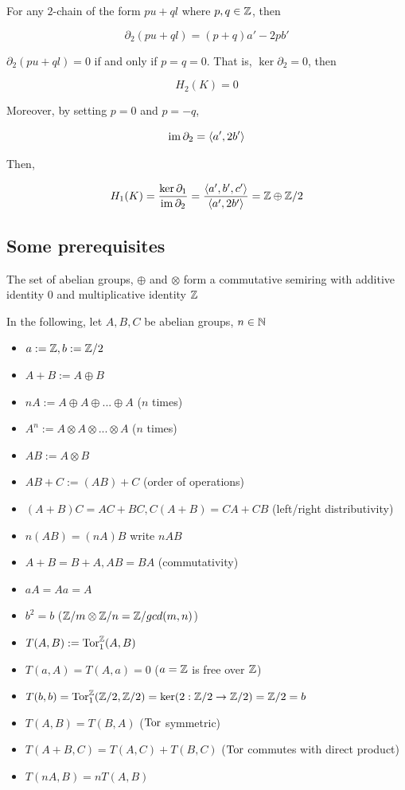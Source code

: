 \documentclass{article}
\begin{document}
For any $2$-chain of the form $pu + ql$ where $p, q \in \mathbb{Z}$, then 

$$
    \partial_2(pu + ql) = (p+q)a' - 2pb'
$$

$\partial_2(pu + ql) = 0$ if and only if $p = q = 0$. That is, $\ker \partial_2 = 0$, then 

$$
    H_2(K) = 0 
$$

Moreover, by setting $p = 0$ and $p = -q$, 

$$
    \operatorname{im} \partial_2 = \langle a', 2b'\rangle
$$

Then,

$$
    H_1(K) = \frac{\ker \partial_1}{\operatorname{im} \partial_2} = \frac{\langle a', b', c'\rangle}{\langle a', 2b'\rangle} = \mathbb{Z} \oplus \mathbb{Z} / 2
$$



\subsection{Some prerequisites}

\begin{proposition}
    The set of abelian groups, $\oplus$ and $\otimes$ form a commutative semiring with additive identity $0$ and multiplicative identity $\mathbb{Z}$
\end{proposition}

In the following, let $A, B, C$ be abelian groups, $n \in \mathbb{N}$
\begin{itemize}
    \item $a := \mathbb{Z}, b := \mathbb{Z} / 2$
    \item $A + B := A \oplus B$
    \item $nA := A \oplus A \oplus ... \oplus A$ ($n$ times)
    \item $A^n := A \otimes A \otimes ... \otimes A$ ($n$ times)
    \item $AB := A \otimes B$
    \item $AB + C := (AB) + C$ (order of operations)
    \item $(A + B) C = AC + BC, C (A + B) = CA + CB$ (left/right distributivity)
    \item $n(AB) = (nA)B$ write $nAB$
    \item $A + B = B + A, AB = BA$ (commutativity)
    \item $aA = Aa = A$
    \item $b^2 = b$ ($\mathbb{Z}/m \otimes \mathbb{Z}/n = \mathbb{Z}/gcd(m, n)$)
    \item $T(A, B) := \operatorname{Tor}^{\mathbb{Z}}_1(A, B)$
    \item $T(a, A) = T(A, a) = 0$ ($a = \mathbb{Z}$ is free over $\mathbb{Z}$)
    \item $T(b, b) = \operatorname{Tor}^{\mathbb{Z}}_1(\mathbb{Z}/2, \mathbb{Z}/2) = \ker (2: \mathbb{Z}/2 \to \mathbb{Z}/2) = \mathbb{Z}/2 = b$
    \item $T(A, B) = T(B, A)$ ($\operatorname{Tor}$ symmetric)
    \item $T(A + B, C) = T(A, C) + T(B, C)$ ($\operatorname{Tor}$ commutes with direct product)
    \item $T(nA, B) = nT(A, B)$
\end{itemize}
\end{document}
